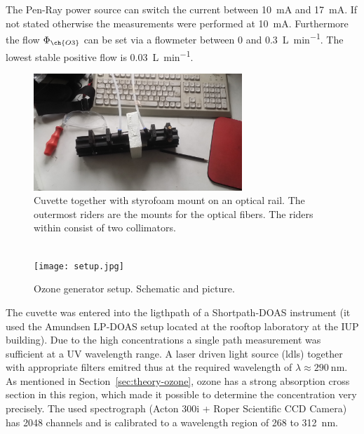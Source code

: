 The Pen-Ray power source can switch the current between
\SI{10}{\milli\ampere} and \SI{17}{\milli\ampere}. If not stated
otherwise the measurements were performed at \SI{10}{\milli\ampere}.
Furthermore the flow $\Phi_{\ch{O 3}}$ can be set via a flowmeter
between \num{0} and \SI{0.3}{\liter\per\minute}. The lowest stable
positive flow is \SI{0.03}{\liter\per\minute}.

\begin{figure}[htbp]
  \centering
  \includegraphics[width=0.7\textwidth]{images/cuvette.jpg}
  \caption{Cuvette together with styrofoam mount on an optical
    rail. The outermost riders are the mounts for the optical
    fibers. The riders within consist of two collimators.}
  \label{fig:cuvette}
\end{figure}

\begin{figure}[htbp]
  \centering
  {
  \def\svgwidth{0.9\linewidth}
  
  }
  \phantom{h}\\
  \vspace{2cm}
  \texttt{[image: setup.jpg]}
  \caption{Ozone generator setup. Schematic and picture.}
  \label{fig:setup}
\end{figure}

The cuvette was entered into the ligthpath of a Shortpath-DOAS
instrument (it used the Amundsen LP-DOAS setup located at the rooftop
laboratory at the IUP building). Due to the high 
concentrations a single path measurement was sufficient at a UV
wavelength range. A laser driven light source (ldls) together with
appropriate filters emitred thus at the required wavelength of
$\lambda \approx \SI{290}{\nano\meter}$. As mentioned in
Section~\ref{sec:theory-ozone}, ozone has a strong absorption cross
section in this region, which made it possible to determine the
concentration very precisely. The used spectrograph (Acton 300i +
Roper Scientific CCD Camera) has 2048 channels
and is calibrated to a wavelength region of \num{268} to
\SI{312}{\nano\meter}.

